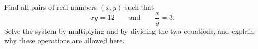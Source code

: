 Find all pairs of real numbers $(x,y)$ such that
\[
xy=12\qquad\text{and}\qquad \dfrac{x}{y}=3 .
\]
Solve the system by multiplying and by dividing the two equations, and explain why these operations are allowed here.
